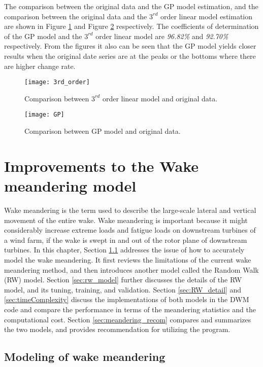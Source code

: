 \documentclass{umthesis}
\begin{document}
The comparison between the original data and the GP model estimation, and the comparison between the original data and the $3^{rd}$ order linear model estimation are shown in Figure \ref{fig:3rd_order} and Figure \ref{fig:GP} respectively. The coefficients of determination of the GP model and the $3^{rd}$ order linear model are \emph{96.82\%} and \emph{92.70\%} respectively. From the figures it also can be seen that the GP model yields closer results when the original date series are at the peaks or the bottoms where there are higher change rate.

\begin{figure}
  \centering
  \texttt{[image: 3rd\_order]}
  \caption{Comparison between $3^{rd}$ order linear model and original data.}\label{fig:3rd_order}
\end{figure}

\begin{figure}
  \centering
  \texttt{[image: GP]}
  \caption{Comparison between GP model and original data.}\label{fig:GP}
\end{figure}


\chapter{Improvements to the Wake meandering model}
Wake meandering is the term used to describe the large-scale lateral and vertical movement of the entire wake. Wake meandering is important because it might considerably increase extreme loads and fatigue loads on downstream turbines of a wind farm, if the wake is swept in and out of the rotor plane of downstream turbines. In this chapter, Section \ref{sec:general_meandering_model} addresses the issue of how to accurately model the wake meandering. It first reviews the limitations of the current wake meandering method, and then introduces another model called the Random Walk (RW) model. Section \ref{sec:rw_model}   further discusses the details of the RW model, and its tuning, training, and validation. Section \ref{sec:RW_detail} and \ref{sec:timeComplexity} discuss the implementations of both models in the DWM code and compare the performance in terms of the meandering statistics and the computational cost. Section \ref{sec:meandering_recom} compares and summarizes the two models, and provides recommendation for utilizing the program.

\section{Modeling of wake meandering}\label{sec:general_meandering_model}
\end{document}
